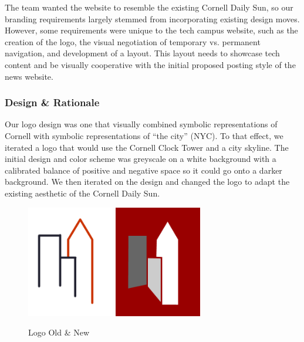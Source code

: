 \documentclass[12pt]{article} %
\begin{document}
The team wanted the website to resemble the existing Cornell Daily Sun, so our branding requirements largely stemmed from incorporating existing design moves. However, some requirements were unique to the tech campus website, such as the creation of the logo, the visual negotiation of temporary vs. permanent navigation, and development of a layout. This layout needs to showcase tech content and be visually cooperative with the initial proposed posting style of the news website.

\subsubsection{Design \& Rationale}

Our logo design was one that visually combined symbolic representations of Cornell with symbolic representations of “the city” (NYC). To that effect, we iterated a logo that would use the Cornell Clock Tower and a city skyline. The initial design and color scheme was greyscale on a white background with a calibrated balance of positive and negative space so it could go onto a darker background.  We then iterated on the design and changed the logo to adapt the existing aesthetic of the Cornell Daily Sun.

\begin{figure}[htbp]
\begin{center}
\includegraphics[width=1.5in]{images/logo_old}
\includegraphics[width=1.5in]{images/LogoOnRed_new}
\caption{Logo Old \& New}
\end{center}
\end{figure}
\end{document}
